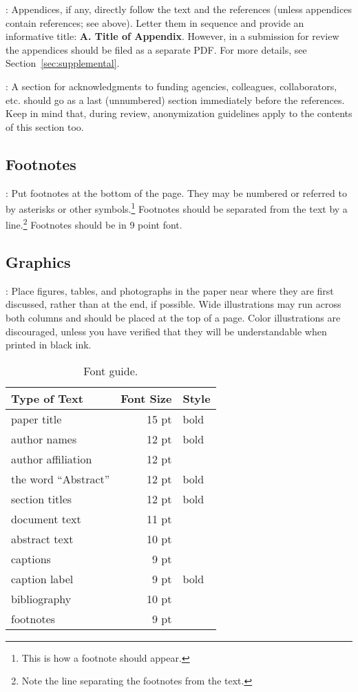 : Appendices, if any, directly follow the text and
the references (unless appendices contain references; see above). Letter
them in sequence and provide an informative title: {\bf A. Title of Appendix}. 
However, in a submission for review the appendices should be filed as a 
separate PDF. For more details, see Section~\ref{sec:supplemental}.

: A section for acknowledgments to funding
agencies, colleagues, collaborators, etc. should go as a last (unnumbered)
section immediately before the references. Keep in mind that, during review,
anonymization guidelines apply to the contents of this section too.

\subsection{Footnotes}

: Put footnotes at the bottom of the page. They may be
numbered or referred to by asterisks or other symbols.\footnote{This is
how a footnote should appear.} Footnotes should be separated from the text
by a line.\footnote{Note the line separating the footnotes from the text.}
Footnotes should be in 9 point font.

\subsection{Graphics}

: Place figures, tables, and photographs in the
paper near where they are first discussed, rather than at the end, if possible.
Wide illustrations may run across both columns and should be placed at the
top of a page. Color illustrations are discouraged, unless you have verified
that they will be understandable when printed in black ink. 

\begin{table}
\small
\centering
\begin{tabular}{|l|rl|}
\hline \bf Type of Text & \bf Font Size & \bf Style \\ \hline
paper title & 15 pt & bold \\
author names & 12 pt & bold \\
author affiliation & 12 pt & \\
the word ``Abstract'' & 12 pt & bold \\
section titles & 12 pt & bold \\
document text & 11 pt  &\\
abstract text & 10 pt & \\
captions & 9 pt & \\
caption label & 9 pt & bold \\
bibliography & 10 pt & \\
footnotes & 9 pt & \\
\hline
\end{tabular}
\caption{\label{font-table} Font guide.}
\end{table}

